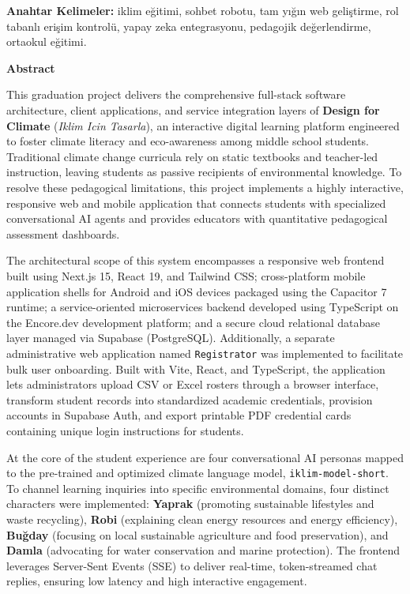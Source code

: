 \documentclass[12pt,a4paper,oneside]{report}
\begin{document}
    \vspace{0.5cm}
    \noindent\textbf{Anahtar Kelimeler:} iklim eğitimi, sohbet robotu, tam yığın web geliştirme, rol tabanlı erişim kontrolü, yapay zeka entegrasyonu, pedagojik değerlendirme, ortaokul eğitimi.

    \clearpage
    \begin{center}
        {\LARGE\bfseries Abstract}\par\vspace{1.2em}
    \end{center}

    This graduation project delivers the comprehensive full-stack software architecture, client applications, and service integration layers of \textbf{Design for Climate} (\textit{Iklim Icin Tasarla}), an interactive digital learning platform engineered to foster climate literacy and eco-awareness among middle school students. Traditional climate change curricula rely on static textbooks and teacher-led instruction, leaving students as passive recipients of environmental knowledge. To resolve these pedagogical limitations, this project implements a highly interactive, responsive web and mobile application that connects students with specialized conversational AI agents and provides educators with quantitative pedagogical assessment dashboards.

    The architectural scope of this system encompasses a responsive web frontend built using Next.js 15, React 19, and Tailwind CSS; cross-platform mobile application shells for Android and iOS devices packaged using the Capacitor 7 runtime; a service-oriented microservices backend developed using TypeScript on the Encore.dev development platform; and a secure cloud relational database layer managed via Supabase (PostgreSQL). Additionally, a separate administrative web application named \texttt{Registrator} was implemented to facilitate bulk user onboarding. Built with Vite, React, and TypeScript, the application lets administrators upload CSV or Excel rosters through a browser interface, transform student records into standardized academic credentials, provision accounts in Supabase Auth, and export printable PDF credential cards containing unique login instructions for students.

    At the core of the student experience are four conversational AI personas mapped to the pre-trained and optimized climate language model, \texttt{iklim-model-short}. To channel learning inquiries into specific environmental domains, four distinct characters were implemented: \textbf{Yaprak} (promoting sustainable lifestyles and waste recycling), \textbf{Robi} (explaining clean energy resources and energy efficiency), \textbf{Buğday} (focusing on local sustainable agriculture and food preservation), and \textbf{Damla} (advocating for water conservation and marine protection). The frontend leverages Server-Sent Events (SSE) to deliver real-time, token-streamed chat replies, ensuring low latency and high interactive engagement.
\end{document}
